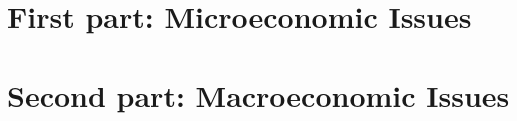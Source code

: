 \documentclass[A4,12pt,twoside]{book}
\begin{document}

\restoregeometry



\part{First part: Microeconomic Issues}




\part{Second part: Macroeconomic Issues}




\printbibliography %
\end{document}
